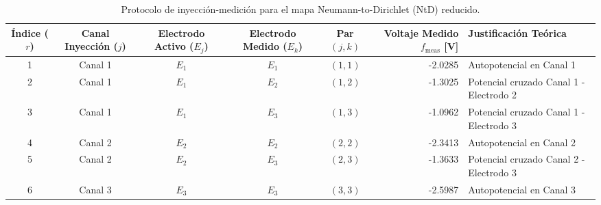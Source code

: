 \begin{table}[htbp]
  \centering
  \caption{Protocolo de inyección-medición para el mapa Neumann-to-Dirichlet (NtD) reducido.}
  \label{tab:measurement_protocol}
  \begin{tabular}{c c c c c r p{5.0cm}}
    \hline\hline
    \textbf{Índice ($r$)} & \textbf{Canal Inyección ($j$)} & \textbf{Electrodo Activo ($E_j$)} & \textbf{Electrodo Medido ($E_k$)} & \textbf{Par $(j, k)$} & \textbf{Voltaje Medido $f_{\text{meas}}$ [V]} & \textbf{Justificación Teórica} \\ \hline
    1 & Canal 1 & $E_1$ & $E_1$ & $(1, 1)$ & -2.0285 & Autopotencial en Canal 1 \\ \hline
    2 & Canal 1 & $E_1$ & $E_2$ & $(1, 2)$ & -1.3025 & Potencial cruzado Canal 1 - Electrodo 2 \\ \hline
    3 & Canal 1 & $E_1$ & $E_3$ & $(1, 3)$ & -1.0962 & Potencial cruzado Canal 1 - Electrodo 3 \\ \hline
    4 & Canal 2 & $E_2$ & $E_2$ & $(2, 2)$ & -2.3413 & Autopotencial en Canal 2 \\ \hline
    5 & Canal 2 & $E_2$ & $E_3$ & $(2, 3)$ & -1.3633 & Potencial cruzado Canal 2 - Electrodo 3 \\ \hline
    6 & Canal 3 & $E_3$ & $E_3$ & $(3, 3)$ & -2.5987 & Autopotencial en Canal 3 \\ \hline
    \hline\hline
  \end{tabular}
\end{table}
